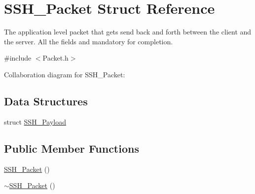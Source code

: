 \hypertarget{structSSH__Packet}{}\section{S\+S\+H\+\_\+\+Packet Struct Reference}
\label{structSSH__Packet}


The application level packet that gets send back and forth between the client and the server. All the fields and mandatory for completion.  




{\ttfamily \#include $<$Packet.\+h$>$}



Collaboration diagram for S\+S\+H\+\_\+\+Packet\+:
\subsection*{Data Structures}
\begin{DoxyCompactItemize}
\item 
struct \hyperlink{structSSH__Packet_1_1SSH__Payload}{S\+S\+H\+\_\+\+Payload}
\end{DoxyCompactItemize}
\subsection*{Public Member Functions}
\begin{DoxyCompactItemize}
\item 
\hyperlink{structSSH__Packet_a0b717b3f7f3f724c54dddba9578145f3}{S\+S\+H\+\_\+\+Packet} ()
\item 
\hyperlink{structSSH__Packet_a476661ce993ff29f35948ad8760f37d5}{$\sim$\+S\+S\+H\+\_\+\+Packet} ()
\end{DoxyCompactItemize}
